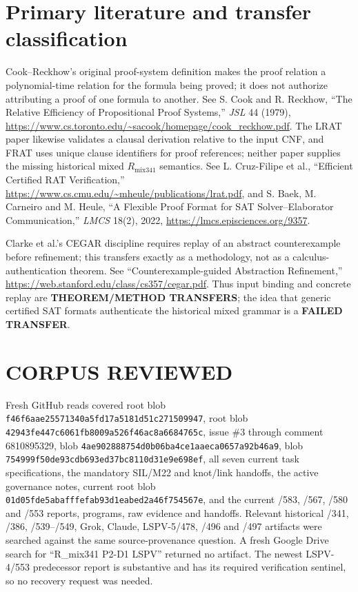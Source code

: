 \documentclass[11pt]{article}
\begin{document}
\section{Primary literature and transfer classification}
Cook--Reckhow's original proof-system definition makes the proof relation a
polynomial-time relation for the formula being proved; it does not authorize
attributing a proof of one formula to another.  See S. Cook and R. Reckhow,
``The Relative Efficiency of Propositional Proof Systems,'' \emph{JSL} 44
(1979), \url{https://www.cs.toronto.edu/~sacook/homepage/cook_reckhow.pdf}.
The LRAT paper likewise validates a clausal derivation relative to the input
CNF, and FRAT uses unique clause identifiers for proof references; neither
paper supplies the missing historical mixed $R_{\mathrm{mix341}}$ semantics.
See L. Cruz-Filipe et al., ``Efficient Certified RAT Verification,''
\url{https://www.cs.cmu.edu/~mheule/publications/lrat.pdf}, and S. Baek,
M. Carneiro and M. Heule, ``A Flexible Proof Format for SAT Solver--Elaborator
Communication,'' \emph{LMCS} 18(2), 2022,
\url{https://lmcs.episciences.org/9357}.

Clarke et al.'s CEGAR discipline requires replay of an abstract
counterexample before refinement; this transfers exactly as a methodology,
not as a calculus-authentication theorem.  See ``Counterexample-guided
Abstraction Refinement,'' \url{https://web.stanford.edu/class/cs357/cegar.pdf}.
Thus input binding and concrete replay are \textbf{THEOREM/METHOD TRANSFERS};
the idea that generic certified SAT formats authenticate the historical mixed
grammar is a \textbf{FAILED TRANSFER}.

\section{CORPUS REVIEWED}
Fresh GitHub reads covered root  blob
\texttt{f46f6aae25571340a5fd17a5181d51c271509947}, root
 blob
\texttt{42943fe447c6061fb8009a526f46ac8a6684765c}, issue \#3 through
comment 6810895329,  blob
\texttt{4ae902888754d0b06ba4ce1aaeca0657a92b46a9}, 
blob \texttt{754999f50de93cdb693ed37bc8110d31e9e698ef}, all seven current task
specifications, the mandatory SIL/M22 and knot/link handoffs, the active
governance notes, current root  blob
\texttt{01d05fde5abafffefab93d1eabed2a46f754567e}, and the current /583,
/567, /580 and /553 reports, programs, raw evidence and handoffs.  Relevant
historical /341, /386, /539--/549, Grok, Claude, LSPV-5/478, /496 and /497
artifacts were searched against the same source-provenance question.  A
fresh Google Drive search for ``R\_mix341 P2-D1 LSPV'' returned no artifact.
The newest LSPV-4/553 predecessor report is substantive and has its required
verification sentinel, so no recovery request was needed.
\end{document}
